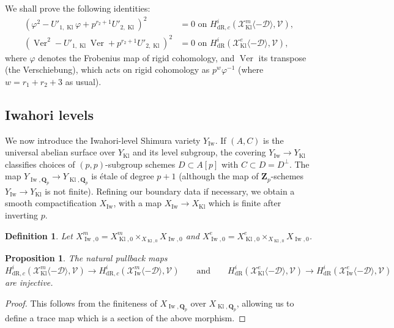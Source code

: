 \documentclass[cjm]{ipart}
\theoremstyle{plain}
\newtheorem{proposition}[theorem]{Proposition}
\newtheorem{definition}[theorem]{Definition}
\theoremstyle{remark}
\DeclareMathOperator{\Iw}{Iw}
\DeclareMathOperator{\Kl}{Kl}
\newcommand{\QQ}{\mathbf{Q}}
\newcommand{\Qp}{\QQ_p}
\newcommand{\Zp}{\mathbf{Z}_p}
\newcommand{\cD}{\mathcal{D}}
\newcommand{\cV}{\mathcal{V}}
\newcommand{\cX}{\mathcal{X}}
\newcommand{\dR}{\mathrm{dR}}
\numberwithin{equation}{subsection}
\begin{document}
  We shall prove the following identities:
  \begin{equation}\label{eq:BPidentities}
  \begin{aligned}
  \left(\varphi^2 - U'_{1, \Kl} \varphi + p^{r_2 + 1} U'_{2, \Kl}\right)^2 &= 0 \text{ on } H^i_{\dR,c} (\cX^m_{\Kl}\langle -\cD\rangle,\cV), \\
  \left(\operatorname{Ver}^2 - U'_{1, \Kl} \operatorname{Ver} + p^{r_2 + 1} U'_{2, \Kl}\right)^2 &= 0  \text{ on } H^i_{\dR} (\cX^e_{\Kl}\langle -\cD\rangle,\cV),
  \end{aligned}
  \end{equation}
  where $\varphi$ denotes the Frobenius map of rigid cohomology, and $\operatorname{Ver}$ its transpose (the Verschiebung), which acts on rigid cohomology as $p^{w} \varphi^{-1}$ (where $w = r_1 + r_2 + 3$ as usual).

 \subsection{Iwahori levels}

  We now introduce the Iwahori-level Shimura variety $Y_{\Iw}$. If $(A, C)$ is the universal abelian surface over $Y_{\Kl}$ and its level subgroup, the covering $Y_{\Iw} \to Y_{\Kl}$ classifies choices of $(p, p)$-subgroup schemes $D \subset A[p]$ with $C \subset D = D^\perp$. The map $Y_{\Iw, \Qp} \to Y_{\Kl, \Qp}$ is \'etale of degree $p + 1$ (although the map of $\Zp$-schemes $Y_{\Iw} \to Y_{\Kl}$ is not finite). Refining our boundary data if necessary, we obtain a smooth compactification $X_{\Iw}$, with a map $X_{\Iw} \to X_{\Kl}$ which is finite after inverting $p$.
  
  \begin{definition}
   Let $X_{\Iw,0}^m=X_{\Kl,0}^m\times_{X_{\Kl,0}} X_{\Iw,0}$ and $X_{\Iw,0}^e=X_{\Kl,0}^e\times_{X_{\Kl,0}} X_{\Iw,0}$.
  \end{definition}

  \begin{proposition}
   The natural pullback maps
   \[ H^i_{\dR,c} (\cX^m_{\Kl}\langle -\cD\rangle,\cV) \to H^i_{\dR,c} (\cX^m_{\Iw}\langle -\cD\rangle,\cV) \qquad\text{and} \qquad H^i_{\dR} (\cX^e_{\Kl}\langle -\cD\rangle,\cV) \to H^i_{\dR} (\cX^e_{\Iw}\langle -\cD\rangle,\cV) \]
   are injective.
  \end{proposition}

  \begin{proof}
   This follows from the finiteness of $X_{\Iw, \Qp}$ over $X_{\Kl, \Qp}$, allowing us to define a trace map which is a section of the above morphism.
  \end{proof}
\end{document}
